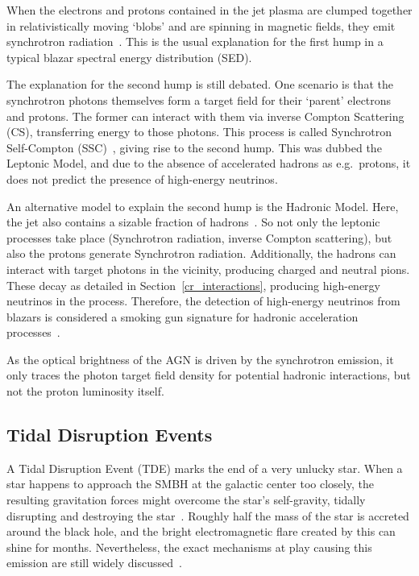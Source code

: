 When the electrons and protons contained in the jet plasma are clumped together in relativistically moving `blobs' and are spinning in magnetic fields, they emit synchrotron radiation~. This is the usual explanation for the first hump in a typical blazar spectral energy distribution (SED).

The explanation for the second hump is still debated. One scenario is that the synchrotron photons themselves form a target field for their `parent' electrons and protons. The former can interact with them via inverse Compton Scattering (CS), transferring energy to those photons. This process is called Synchrotron Self-Compton (SSC)~\cite{Spurio2018}, giving rise to the second hump. This was dubbed the Leptonic Model, and due to the absence of accelerated hadrons as e.g.\ protons, it does not predict the presence of high-energy neutrinos.

An alternative model to explain the second hump is the Hadronic Model. Here, the jet also contains a sizable fraction of hadrons~. So not only the leptonic processes take place (Synchrotron radiation, inverse Compton scattering), but also the protons generate Synchrotron radiation. Additionally, the hadrons can interact with target photons in the vicinity, producing charged and neutral pions. These decay as detailed in Section~\ref{cr_interactions}, producing high-energy neutrinos in the process. Therefore, the detection of high-energy neutrinos from blazars is considered a smoking gun signature for hadronic acceleration processes~.

As the optical brightness of the AGN is driven by the synchrotron emission, it only traces the photon target field density for potential hadronic interactions, but not the proton luminosity itself.

\subsection{Tidal Disruption Events}

A Tidal Disruption Event (TDE) marks the end of a very unlucky star. When a star happens to approach the SMBH at the galactic center too closely, the resulting gravitation forces might overcome the star's self-gravity, tidally disrupting and destroying the star~. Roughly half the mass of the star is accreted around the black hole, and the bright electromagnetic flare created by this can shine for months. Nevertheless, the exact mechanisms at play causing this emission are still widely discussed~.

